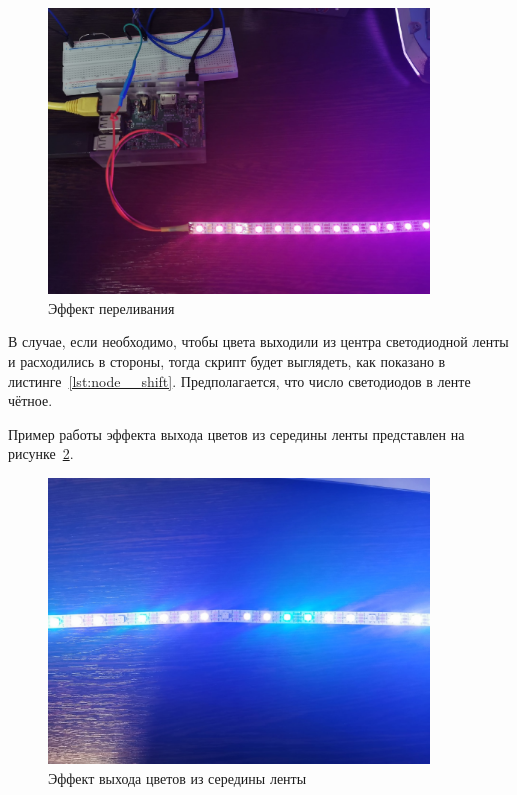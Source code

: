 \begin{figure}[H]
  \centering
  \includegraphics[width=0.9\textwidth]{assets/images/practical/Эффект переливания.jpg}
  \caption{Эффект переливания}
  \label{img:ws2812__rainbow}
\end{figure}

В случае, если необходимо, чтобы цвета выходили из центра светодиодной ленты и расходились в стороны, тогда скрипт будет выглядеть, как показано в листинге~\ref{lst:node__shift}. Предполагается, что число светодиодов в ленте чётное.



Пример работы эффекта выхода цветов из середины ленты представлен на рисунке~\ref{img:ws2812__shift}.

\begin{figure}[H]
  \centering
  \includegraphics[width=0.9\textwidth]{assets/images/practical/Эффект из центра.jpg}
  \caption{Эффект выхода цветов из середины ленты}
  \label{img:ws2812__shift}
\end{figure}

